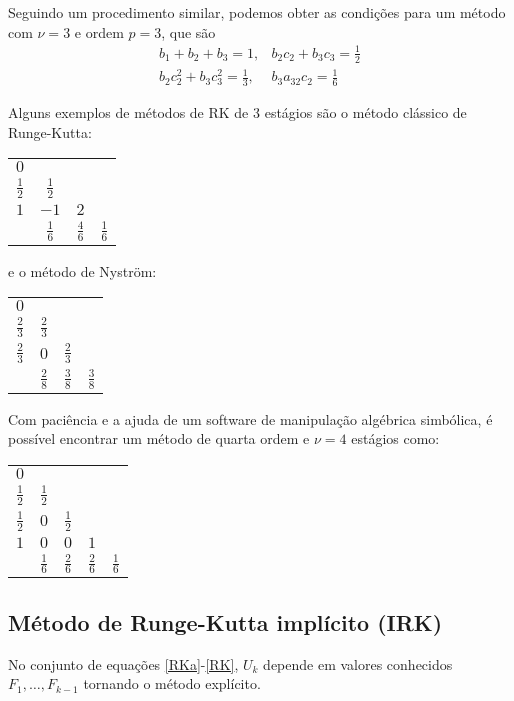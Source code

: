 Seguindo um procedimento similar, podemos obter as condições para um método com $\nu =3$ e ordem $p=3$, que são
\begin{eqnarray}
  b_1+b_2+b_3=1,               & b_2c_2+b_3c_3 = \frac{1}{2} \\
  b_2c_2^2+b_3c_3^2=\frac{1}{3}, & b_3a_{32}c_2=\frac{1}{6}
\end{eqnarray}

Alguns exemplos de métodos de RK de 3 estágios são o método clássico de Runge-Kutta:
\begin{center}
\begin{tabular}{c|ccc}
  $0$ &     &   & \\
  $\frac{1}{2}$ & $\frac{1}{2}$ &   & \\
  $1$ & $-1$ &$2$& \\  \hline
      & $\frac{1}{6}$ &$\frac{4}{6}$& $\frac{1}{6}$
\end{tabular}
\end{center}
e o método de Nyström:
\begin{center}
\begin{tabular}{c|ccc}
  $0$ &     &   & \\
  $\frac{2}{3}$ & $\frac{2}{3}$ &   & \\
  $\frac{2}{3}$ & $0$ &$\frac{2}{3}$& \\  \hline
      & $\frac{2}{8}$ &$\frac{3}{8}$& $\frac{3}{8}$
\end{tabular}
\end{center}

Com paciência e a ajuda de um software de manipulação algébrica simbólica,  é possível encontrar um método de quarta ordem e $\nu =4$ estágios como:
\begin{center}
\begin{tabular}{c|cccc}
  $0$ &     &   &   &    \\
  $\frac{1}{2}$ & $\frac{1}{2}$ &   &   &    \\
  $\frac{1}{2}$ & $0$ &$\frac{1}{2}$&   &    \\
  $1$ & $0$ &$0$&$1$&    \\  \hline
      & $\frac{1}{6}$ &$\frac{2}{6}$& $\frac{2}{6}$& $\frac{1}{6}$
\end{tabular}
\end{center}


\subsection{Método de Runge-Kutta implícito (IRK)}
No conjunto de equações \eqref{RKa}-\eqref{RK}, $U_k$ depende em valores conhecidos $F_1,\ldots ,F_{k-1}$ tornando o método explícito.

